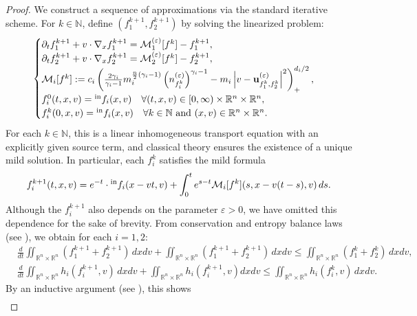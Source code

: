 \documentclass[10pt,reqno]{amsart}
\numberwithin{equation}{section}
\newcommand{\R}{\mathbb R}
\newcommand{\N}{\mathbb N}
\newcommand{\calM}{\mathcal M}
\newcommand{\p}{\partial}
\newcommand{\ve}{\varepsilon}
\begin{document}
\begin{proof}
We construct a sequence of approximations via the standard iterative scheme. For $k \in \mathbb{N}$, define $(f_1^{k+1},f_2^{k+1})$ by solving the linearized problem:
\[%
    \begin{cases}
        \p_t f_1^{k+1} + v\cdot \nabla_x f_1^{k+1} = \calM^{(\ve)}_1[f^k] - f_1^{k+1},\\
        \p_t f_2^{k+1} + v \cdot \nabla_x f_2^{k+1} = \calM^{(\ve)}_2[f^k] - f_2^{k+1},\\
        \calM_i[f^k] := c_i \left(\frac{2\gamma_i}{\gamma_i - 1} m_i^{\frac{n}{2}(\gamma_i - 1)} \left(n_{f_i^k}^{(\ve)}\right)^{\gamma_i - 1} - m_i\left|v - {\bf{u}}_{f_1^k,f_2^k}^{(\ve)}\right|^2 \right)_+^{d_i/2},\\
        f_i^0(t,x,v) = {}^{\rm in}f_i(x,v)\quad \forall (t,x,v)\in [0,\infty)\times\R^n \times \R^n,\\
        f_i^k(0,x,v) = {}^{\rm in}f_i(x,v) \quad \forall k\in \mathbb{N}\text{ and }(x,v)\in \R^n \times \R^n.
    \end{cases}
\]%
For each $k \in \N$, this is a linear inhomogeneous transport equation with an explicitly given source term, and classical theory ensures the existence of a unique mild solution.  In particular, each $f_i^k$ satisfies the mild formula
\begin{align*}
    f_i^{k+1}(t,x,v) = e^{-t}\cdot {}^{\rm in}f_i(x-vt,v) + \int_0^t e^{s-t}\calM_i[f^k](s,x-v(t-s),v)\,ds.
\end{align*}
Although the $f_i^{k+1}$ also depends on the parameter $\ve>0$, we have omitted this dependence for the sake of brevity. From conservation and entropy balance laws (see \cite{CH24,KS24}), we obtain for each $i=1,2$:
\begin{align*}
    &\frac{d}{dt}\iint_{\R^n \times \R^n} (f_1^{k+1} + f_2^{k+1}) \,dxdv + \iint_{\R^n \times \R^n} (f_1^{k+1} + f_2^{k+1}) \,dxdv \le \iint_{\R^n \times \R^n} (f_1^k + f_2^k) \,dxdv ,\\
    &\frac{d}{dt}\iint_{\R^n \times \R^n} h_i(f_i^{k+1},v)\, dx dv + \iint_{\R^n \times \R^n} h_i(f_i^{k+1},v) dxdv \le \iint_{\R^n \times \R^n} h_i(f_i^{k},v) \,dxdv.
\end{align*}
By an inductive argument (see \cite[Lemma 3.3]{KS24}), this shows
\begin{equation}\label{eq: unif}
\begin{split}

\end{split}
\end{equation}
\end{proof}
\end{document}
